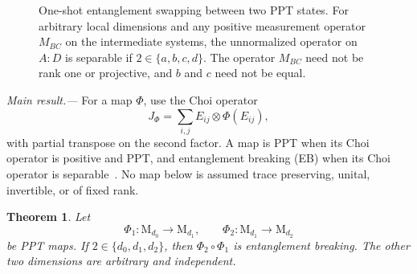\documentclass[aps,prl,reprint,superscriptaddress,nofootinbib]{revtex4-2}
\newcommand{\M}{\mathrm{M}}
\newcommand{\PPT}{\operatorname{PPT}}
\newcommand{\SEP}{\operatorname{SEP}}
\newtheorem{theorem}{Theorem}
\begin{document}
\begin{figure}[t]
\centering
{}
\caption{One-shot entanglement swapping between two PPT states.  For arbitrary
local dimensions and any positive measurement operator $M_{BC}$ on the
intermediate systems, the unnormalized operator on $A{:}D$ is separable if
$2\in\{a,b,c,d\}$.  The operator $M_{BC}$ need not be rank one or
projective, and $b$ and $c$ need not be equal.}
\label{fig:swapping}
\end{figure}

\textit{Main result.---}
For a map $\Phi$, use the Choi operator
\begin{equation}
 J_\Phi=\sum_{i,j}E_{ij}\otimes\Phi(E_{ij}),
\label{eq:choi}
\end{equation}
with partial transpose on the second factor.  A map is PPT when its Choi
operator is positive and PPT, and entanglement breaking (EB) when its Choi
operator is separable~\cite{Choi1975,Horodecki2003}.  No map below is assumed
trace preserving, unital, invertible, or of fixed rank.

\begin{theorem}
\label{thm:anywhere}
Let
\begin{equation}
 \Phi_1:\M_{d_0}\longrightarrow\M_{d_1},\qquad
 \Phi_2:\M_{d_1}\longrightarrow\M_{d_2}
\label{eq:pair}
\end{equation}
be PPT maps.  If $2\in\{d_0,d_1,d_2\}$, then
$\Phi_2\circ\Phi_1$ is entanglement breaking.  The other two dimensions
are arbitrary and independent.
\end{theorem}
\end{document}
